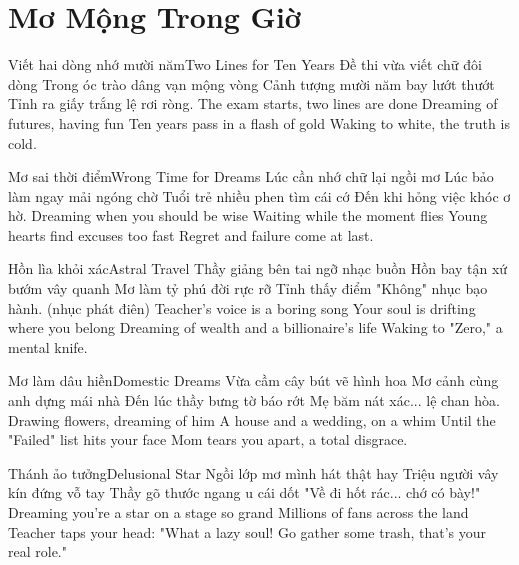 \chapter{Mơ Mộng Trong Giờ}

\begin{tutuyetbox}{Viết hai dòng nhớ mười năm}{Two Lines for Ten Years}
Đề thi vừa viết chữ đôi dòng
Trong óc trào dâng vạn mộng vòng
Cảnh tượng mười năm bay lướt thướt
Tỉnh ra giấy trắng lệ rơi ròng.
\tcblower
The exam starts, two lines are done 
Dreaming of futures, having fun 
Ten years pass in a flash of gold 
Waking to white, the truth is cold.
\end{tutuyetbox}

\begin{tutuyetbox}{Mơ sai thời điểm}{Wrong Time for Dreams}
Lúc cần nhớ chữ lại ngồi mơ
Lúc bảo làm ngay mải ngóng chờ
Tuổi trẻ nhiều phen tìm cái cớ
Đến khi hỏng việc khóc ơ hờ.
\tcblower
Dreaming when you should be wise 
Waiting while the moment flies 
Young hearts find excuses too fast 
Regret and failure come at last.
\end{tutuyetbox}

\begin{tutuyetbox}{Hồn lìa khỏi xác}{Astral Travel}
Thầy giảng bên tai ngỡ nhạc buồn
Hồn bay tận xứ bướm vây quanh
Mơ làm tỷ phú đời rực rỡ
Tỉnh thấy điểm "Không" nhục bạo hành. (nhục phát điên)
\tcblower
Teacher's voice is a boring song
Your soul is drifting where you belong
Dreaming of wealth and a billionaire's life
Waking to "Zero," a mental knife.
\end{tutuyetbox}

\begin{tutuyetbox}{Mơ làm dâu hiền}{Domestic Dreams}
Vừa cầm cây bút vẽ hình hoa
Mơ cảnh cùng anh dựng mái nhà
Đến lúc thầy bưng tờ báo rớt
Mẹ băm nát xác... lệ chan hòa.
\tcblower
Drawing flowers, dreaming of him
A house and a wedding, on a whim
Until the "Failed" list hits your face
Mom tears you apart, a total disgrace.
\end{tutuyetbox}

\begin{tutuyetbox}{Thánh ảo tưởng}{Delusional Star}
Ngồi lớp mơ mình hát thật hay
Triệu người vây kín đứng vỗ tay
Thầy gõ thước ngang u cái dốt
"Về đi hốt rác... chớ có bày!"
\tcblower
Dreaming you're a star on a stage so grand
Millions of fans across the land
Teacher taps your head: "What a lazy soul!
Go gather some trash, that's your real role."
\end{tutuyetbox}

